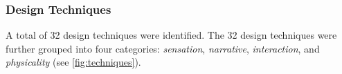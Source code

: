 



\subsubsection{Design Techniques}
\label{sssec:techniques}
A total of 32 design techniques were identified. The 32 design techniques were further grouped into four categories: \textit{sensation}, \textit{narrative}, \textit{interaction}, and \textit{physicality} (see \autoref{fig:techniques}).

